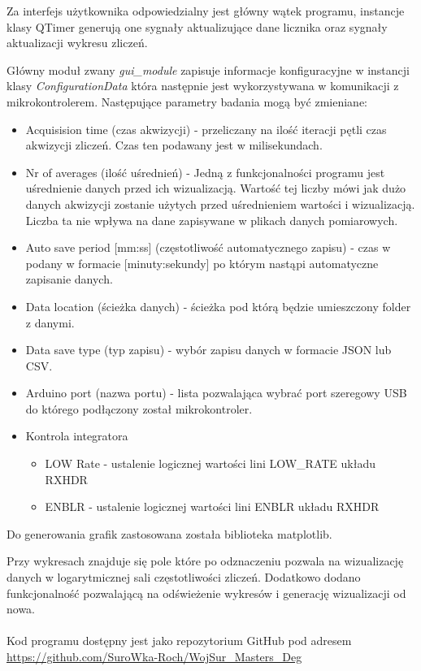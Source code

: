 Za interfejs użytkownika odpowiedzialny jest główny wątek programu, instancje klasy QTimer\cite{doc pyqt} generują one sygnały aktualizujące dane licznika oraz sygnały aktualizacji wykresu zliczeń. 

Główny moduł zwany \textit{gui\_module} zapisuje informacje konfiguracyjne w instancji klasy \textit{ConfigurationData} która następnie jest wykorzystywana w komunikacji z mikrokontrolerem. Następujące parametry badania mogą być zmieniane:
\begin{itemize}
        \item Acquisision time (czas akwizycji) - przeliczany na ilość iteracji pętli czas akwizycji zliczeń. Czas ten podawany jest w milisekundach.
        \item Nr of averages (ilość uśrednień) - Jedną z funkcjonalności programu jest uśrednienie danych przed ich wizualizacją. Wartość tej liczby mówi jak dużo danych akwizycji zostanie użytych przed uśrednieniem wartości i wizualizacją. Liczba ta nie wpływa na dane zapisywane w plikach danych pomiarowych.
        \item Auto save period [mm:ss] (częstotliwość automatycznego zapisu) - czas w podany w formacie [minuty:sekundy] po którym nastąpi automatyczne zapisanie danych. 
        \item Data location (ścieżka danych) - ścieżka pod którą będzie umieszczony folder z danymi. 
        \item Data save type (typ zapisu) - wybór zapisu danych w formacie JSON lub CSV.
        \item Arduino port (nazwa portu) - lista pozwalająca wybrać port szeregowy USB do którego podłączony został mikrokontroler. 
        \item Kontrola integratora 
        \begin{itemize}
                \item LOW Rate - ustalenie logicznej wartości lini LOW\_RATE układu RXHDR
                \item ENBLR - ustalenie logicznej wartości lini ENBLR układu RXHDR
        \end{itemize} 
\end{itemize}

Do generowania grafik zastosowana została biblioteka matplotlib\cite{doc matplotlib}. 

Przy wykresach znajduje się pole które po odznaczeniu pozwala na wizualizację danych w logarytmicznej sali częstotliwości zliczeń. Dodatkowo dodano funkcjonalność pozwalającą na odświeżenie wykresów i generację wizualizacji od nowa.

\paragraph*{}

Kod programu dostępny jest jako repozytorium GitHub pod adresem \url{https://github.com/SuroWka-Roch/WojSur_Masters_Deg}
